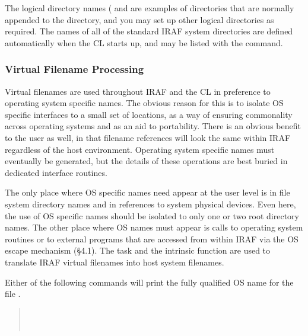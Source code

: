 \begin{quotation}\noindent
{} 
\end{quotation}

\noindent
The logical directory names ( and  are examples
of directories that are normally appended to the  
directory, and you may set up other logical directories as required.
The names of all of the standard IRAF system directories are defined 
automatically when the CL starts up, and may be listed with the
 command.

\subsubsection{Virtual Filename Processing}

\ppind
Virtual filenames are used throughout IRAF and the CL in preference
to operating system specific names.  The obvious reason for this is
to isolate OS specific interfaces to a small set of locations, as
a way of ensuring commonality across operating systems and as an
aid to portability.  There is an obvious benefit to the user as well,
in that filename references will look the same within IRAF regardless
of the host environment.  Operating system specific names must
eventually be generated, but the details of these operations are 
best buried in dedicated interface routines.

The only place where OS specific names need appear at the user level is 
in file system directory names and in references to system physical devices.
Even here, the use of OS specific names should be isolated to only
one or two root directory names.
The other place where OS names must appear is calls to operating 
system routines or to external programs that are accessed from within 
IRAF via the OS escape mechanism (\S 4.1).  The  task
and the  intrinsic function are used to translate IRAF virtual
filenames into host system filenames.

Either of the following commands will print the fully qualified OS name
for the file .

\begin{quotation}\noindent
{} \\
\medskip
{} \\
\end{quotation}

